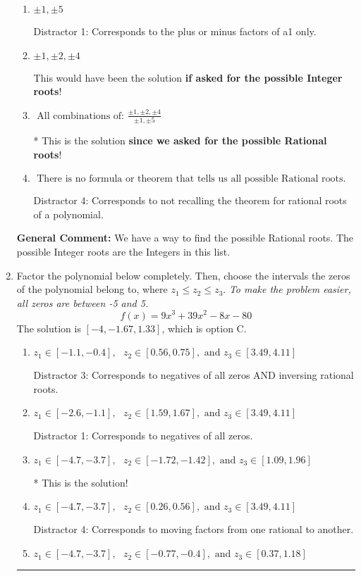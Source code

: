 \documentclass{extbook}[14pt]
\newcommand{\litem}[1]{\item #1

\rule{\textwidth}{0.4pt}}
\begin{document}
\begin{enumerate}
{\begin{enumerate}[label=\Alph*.]
 Distractor 3: Corresponds to the plus or minus of the inverse quotient (an/a0) of the factors. 
\item \( \pm 1,\pm 5 \)

 Distractor 1: Corresponds to the plus or minus factors of a1 only.
\item \( \pm 1,\pm 2,\pm 4 \)

This would have been the solution \textbf{if asked for the possible Integer roots}!
\item \( \text{ All combinations of: }\frac{\pm 1,\pm 2,\pm 4}{\pm 1,\pm 5} \)

* This is the solution \textbf{since we asked for the possible Rational roots}!
\item \( \text{ There is no formula or theorem that tells us all possible Rational roots.} \)

 Distractor 4: Corresponds to not recalling the theorem for rational roots of a polynomial.
\end{enumerate}

\textbf{General Comment:} We have a way to find the possible Rational roots. The possible Integer roots are the Integers in this list.
}
\litem{
Factor the polynomial below completely. Then, choose the intervals the zeros of the polynomial belong to, where $z_1 \leq z_2 \leq z_3$. \textit{To make the problem easier, all zeros are between -5 and 5.}
\[ f(x) = 9x^{3} +39 x^{2} -8 x -80 \]The solution is \( [-4, -1.67, 1.33] \), which is option C.\begin{enumerate}[label=\Alph*.]
\item \( z_1 \in [-1.1, -0.4], \text{   }  z_2 \in [0.56, 0.75], \text{   and   } z_3 \in [3.49, 4.11] \)

 Distractor 3: Corresponds to negatives of all zeros AND inversing rational roots.
\item \( z_1 \in [-2.6, -1.1], \text{   }  z_2 \in [1.59, 1.67], \text{   and   } z_3 \in [3.49, 4.11] \)

 Distractor 1: Corresponds to negatives of all zeros.
\item \( z_1 \in [-4.7, -3.7], \text{   }  z_2 \in [-1.72, -1.42], \text{   and   } z_3 \in [1.09, 1.96] \)

* This is the solution!
\item \( z_1 \in [-4.7, -3.7], \text{   }  z_2 \in [0.26, 0.56], \text{   and   } z_3 \in [3.49, 4.11] \)

 Distractor 4: Corresponds to moving factors from one rational to another.
\item \( z_1 \in [-4.7, -3.7], \text{   }  z_2 \in [-0.77, -0.4], \text{   and   } z_3 \in [0.37, 1.18] \)


\end{enumerate}}
\end{enumerate}
\end{document}

